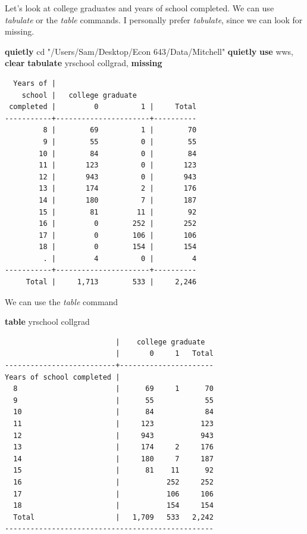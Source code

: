 \documentclass[
]{book}
\newenvironment{Shaded}{\begin{snugshade}}{\end{snugshade}}
\newcommand{\FunctionTok}[1]{\textcolor[rgb]{0.13,0.29,0.53}{\textbf{#1}}}
\newcommand{\KeywordTok}[1]{\textcolor[rgb]{0.13,0.29,0.53}{\textbf{#1}}}
\newcommand{\NormalTok}[1]{#1}
\newcommand{\StringTok}[1]{\textcolor[rgb]{0.31,0.60,0.02}{#1}}
\begin{document}
Let's look at college graduates and years of school completed. We can use \emph{tabulate} or the \emph{table} commands. I personally prefer \emph{tabulate}, since we can look for missing.

\begin{Shaded}
\begin{Highlighting}[]
\KeywordTok{quietly}\NormalTok{ cd }\StringTok{"/Users/Sam/Desktop/Econ 643/Data/Mitchell"}
\KeywordTok{quietly} \KeywordTok{use}\NormalTok{ wws, }\KeywordTok{clear}
\KeywordTok{tabulate}\NormalTok{ yrschool collgrad, }\FunctionTok{missing}
\end{Highlighting}
\end{Shaded}

\begin{verbatim}
  Years of |
    school |   college graduate
 completed |         0          1 |     Total
-----------+----------------------+----------
         8 |        69          1 |        70 
         9 |        55          0 |        55 
        10 |        84          0 |        84 
        11 |       123          0 |       123 
        12 |       943          0 |       943 
        13 |       174          2 |       176 
        14 |       180          7 |       187 
        15 |        81         11 |        92 
        16 |         0        252 |       252 
        17 |         0        106 |       106 
        18 |         0        154 |       154 
         . |         4          0 |         4 
-----------+----------------------+----------
     Total |     1,713        533 |     2,246 
\end{verbatim}

We can use the \emph{table} command

\begin{Shaded}
\begin{Highlighting}[]
\KeywordTok{table}\NormalTok{ yrschool collgrad}
\end{Highlighting}
\end{Shaded}

\begin{verbatim}
                          |    college graduate  
                          |       0     1   Total
--------------------------+----------------------
Years of school completed |                      
  8                       |      69     1      70
  9                       |      55            55
  10                      |      84            84
  11                      |     123           123
  12                      |     943           943
  13                      |     174     2     176
  14                      |     180     7     187
  15                      |      81    11      92
  16                      |           252     252
  17                      |           106     106
  18                      |           154     154
  Total                   |   1,709   533   2,242
-------------------------------------------------
\end{verbatim}
\end{document}
